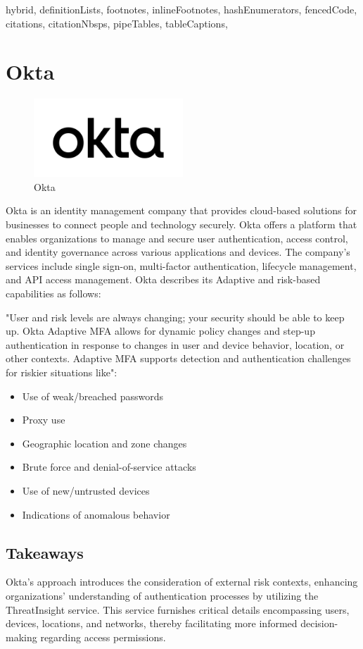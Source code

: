 \documentclass[
  digital,     %
  oneside,     %
  nosansbold,  %
  nocolorbold, %
  lof,         %
  lot,         %
]{fithesis4}
\begin{document}
\begin{markdown*}{%
  hybrid,
  definitionLists,
  footnotes,
  inlineFootnotes,
  hashEnumerators,
  fencedCode,
  citations,
  citationNbsps,
  pipeTables,
  tableCaptions,
}
\newpage
\section{Okta}

\begin{figure}[htbp]
  \centering
  \includegraphics[width=0.5\textwidth]{img/okta.png}
  \caption{Okta}
  \label{fig:okta-logo}
\end{figure}

Okta is an identity management company that provides cloud-based solutions for businesses to connect people and technology securely.
Okta offers a platform that enables organizations to manage and secure user authentication, access control, and identity governance across various applications and devices.
The company's services include single sign-on, multi-factor authentication, lifecycle management, and API access management.
Okta describes its Adaptive and risk-based capabilities as follows:

"User and risk levels are always changing; your security should be able to keep up.
Okta Adaptive MFA allows for dynamic policy changes and step-up authentication in response to changes in user and device behavior, location, or other contexts.
Adaptive MFA supports detection and authentication challenges for riskier situations like":


\begin{itemize}
    \item Use of weak/breached passwords
    \item Proxy use
    \item Geographic location and zone changes
    \item Brute force and denial-of-service attacks
    \item Use of new/untrusted devices
    \item Indications of anomalous behavior \cite{existing-okta}
\end{itemize}

\newpage
\subsection{Takeaways}
Okta's approach introduces the consideration of external risk contexts, enhancing organizations' understanding of authentication processes by utilizing the ThreatInsight service.
This service furnishes critical details encompassing users, devices, locations, and networks, thereby facilitating more informed decision-making regarding access permissions.


\end{markdown*}
\end{document}
